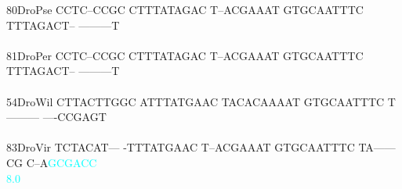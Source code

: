 \documentclass[11pt,twoside,reqno,a4paper]{article}
\begin{document}
{80\hspace*{2\charwidth}DroPse	CCTC--CCGC	CTTTATAGAC	T--ACGAAAT	GTGCAATTTC	TTTAGACT--	---------T	\\
\hspace*{4\charwidth}\hspace*{7\charwidth}\hspace*{1\charwidth}\hspace*{1\charwidth}\hspace*{1\charwidth}\hspace*{1\charwidth}\hspace*{1\charwidth}\hspace*{1\charwidth}\\
81\hspace*{2\charwidth}DroPer	CCTC--CCGC	CTTTATAGAC	T--ACGAAAT	GTGCAATTTC	TTTAGACT--	---------T	\\
\hspace*{4\charwidth}\hspace*{7\charwidth}\hspace*{1\charwidth}\hspace*{1\charwidth}\hspace*{1\charwidth}\hspace*{1\charwidth}\hspace*{1\charwidth}\hspace*{1\charwidth}\\
54\hspace*{2\charwidth}DroWil	CTTACTTGGC	ATTTATGAAC	TACACAAAAT	GTGCAATTTC	T---------	----CCGAGT	\\
\hspace*{4\charwidth}\hspace*{7\charwidth}\hspace*{1\charwidth}\hspace*{1\charwidth}\hspace*{1\charwidth}\hspace*{1\charwidth}\hspace*{1\charwidth}\hspace*{1\charwidth}\\
83\hspace*{2\charwidth}DroVir	TCTACAT---	-TTTATGAAC	T--ACGAAAT	GTGCAATTTC	TA------CG	C--A\textcolor{cyan}{G}\textcolor{cyan}{C}\textcolor{cyan}{G}\textcolor{cyan}{A}\textcolor{cyan}{C}\textcolor{cyan}{C}	\\
\hspace*{4\charwidth}\hspace*{7\charwidth}\hspace*{1\charwidth}\hspace*{1\charwidth}\hspace*{1\charwidth}\hspace*{1\charwidth}\hspace*{1\charwidth}\hspace*{54\charwidth}\textcolor{cyan}{8.0}\hspace*{1\charwidth}\\
}
\end{document}
